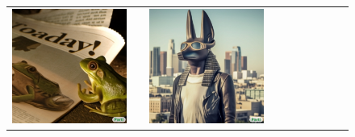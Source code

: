 \begin{figure}[ht!]
\begin{adjustwidth}{-0.8in}{-0.5in}  
    \centering                     
    \footnotesize
\setlength\tabcolsep{1pt}
\vspace{-0.5in}
\begin{tabular}{cccccccccccccccccccc}
\multicolumn{6}{c}{\includegraphics[width=\thirdcolwidth\textwidth]{figures/cherries/frog.jpg}} &&
\multicolumn{6}{c}{\includegraphics[width=\thirdcolwidth\textwidth]{figures/cherries/anubis_la.jpg}} &&

\end{tabular}
\end{adjustwidth}
\end{figure}
